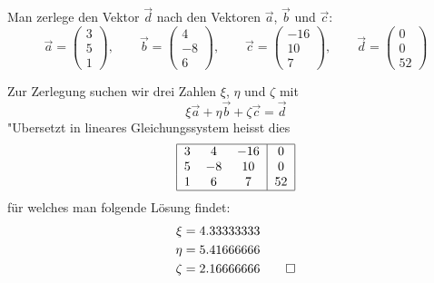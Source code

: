 Man zerlege den Vektor $\vec d$ nach den Vektoren $\vec a$, $\vec b$ und
$\vec c$:
\[
\vec a=\begin{pmatrix}3\\5\\1\end{pmatrix},\qquad
\vec b=\begin{pmatrix}4\\-8\\6\end{pmatrix},\qquad
\vec c=\begin{pmatrix}-16\\10\\7\end{pmatrix},\qquad
\vec d=\begin{pmatrix}0\\0\\52\end{pmatrix}
\]

\begin{loesung}
Zur Zerlegung suchen wir drei Zahlen $\xi$, $\eta$ und $\zeta$ mit
\[
\xi \vec a
+
\eta \vec b
+
\zeta \vec c
=
\vec d
\]
"Ubersetzt in lineares Gleichungssystem heisst dies
\[
\begin{tabular}{|ccc|c|}
\hline
3&4&$-16$&0\\
5&$-8$&10&0\\
1&6&7&52\\
\hline
\end{tabular}
\]
für welches man folgende Lösung findet:
\begin{align*}
\xi&=4.33333333\\
\eta&=5.41666666\\
\zeta&=2.16666666
\qedhere
\end{align*}
\end{loesung}

